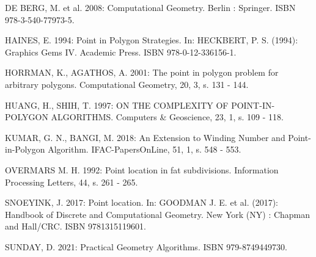 \documentclass[11pt]{article}
\begin{document}
DE BERG, M. et al. 2008: Computational Geometry. Berlin : Springer. ISBN 978-3-540-77973-5.

HAINES, E. 1994: Point in Polygon Strategies. In: HECKBERT, P. S. (1994): Graphics Gems IV. Academic Press. ISBN 978-0-12-336156-1.

HORRMAN, K., AGATHOS, A. 2001: The point in polygon problem for arbitrary polygons. Computational Geometry, 20, 3, s. 131 - 144.

HUANG, H., SHIH, T. 1997: ON THE COMPLEXITY OF POINT-IN-POLYGON ALGORITHMS. Computers \& Geoscience, 23, 1, s. 109 - 118.

KUMAR, G. N., BANGI, M. 2018: An Extension to Winding Number and Point-in-Polygon Algorithm. IFAC-PapersOnLine, 51, 1, s. 548 - 553.

OVERMARS M. H. 1992: Point location in fat subdivisions. Information Processing Letters, 44, s. 261 - 265.

SNOEYINK, J. 2017: Point location. In: GOODMAN J. E. et al. (2017): Handbook of Discrete and Computational Geometry. New York (NY) : Chapman and Hall/CRC. ISBN 9781315119601.

SUNDAY, D. 2021: Practical Geometry Algorithms. ISBN 979-8749449730.
\end{document}
